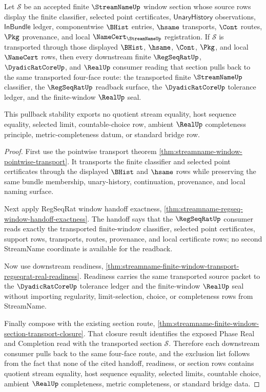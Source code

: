 \begin{theorem}
\label{thm:streamname-finite-window-section-pullback-stability}
Let $\mathcal{S}$ be an accepted finite $\StreamNameUp$ window section whose
source rows display the finite classifier, selected point certificates,
$\mathsf{UnaryHistory}$ observations, $\mathsf{InBundle}$ ledger,
componentwise $\BHist$ entries, $\hsame$ transports, $\Cont$ routes, $\Pkg$
provenance, and local $\NameCert_{\StreamNameUp}$ registration. If
$\mathcal{S}$ is transported through those displayed $\BHist$, $\hsame$,
$\Cont$, $\Pkg$, and local $\NameCert$ rows, then every downstream finite
$\RegSeqRatUp$, $\DyadicRatCoreUp$, and $\RealUp$ consumer reading that
section pulls back to the same transported four-face route: the transported
finite $\StreamNameUp$ classifier, the $\RegSeqRatUp$ readback surface, the
$\DyadicRatCoreUp$ tolerance ledger, and the finite-window $\RealUp$ seal.

This pullback stability exports no quotient stream equality, host sequence
equality, selected limit, countable-choice row, ambient $\RealUp$
completeness principle, metric-completeness datum, or standard bridge row.
\end{theorem}
\begin{proof}
First use the pointwise transport theorem
\autoref{thm:streamname-window-pointwise-transport}. It transports the finite
classifier and selected point certificates through the displayed $\BHist$ and
$\hsame$ rows while preserving the same bundle membership, unary-history,
continuation, provenance, and local naming surface.

Next apply RegSeqRat window handoff exactness,
\autoref{thm:streamname-regseq-window-handoff-exactness}. The handoff says
that the $\RegSeqRatUp$ consumer reads exactly the transported finite-window
classifier, selected point certificates, support rows, transports, routes,
provenance, and local certificate rows; no second StreamName coordinate is
available for the readback.

Now use downstream readiness,
\autoref{thm:streamname-finite-window-transport-regseqrat-real-readiness}.
Readiness carries the same transported source packet to the
$\DyadicRatCoreUp$ tolerance ledger and the finite-window $\RealUp$ seal
without importing regularity, limit-selection, choice, or completeness rows
from StreamName.

Finally compose with the existing section route,
\autoref{thm:streamname-finite-window-section-transport-closure}. That
closure result identifies the exposed Phase Real and Completion read with the
transported section $\mathcal{S}$. Therefore each downstream consumer pulls
back to the same four-face route, and the exclusion list follows from the
fact that none of the cited handoff, readiness, or section rows contains
quotient stream equality, host sequence equality, selected limits,
countable choice, ambient $\RealUp$ completeness, metric completeness, or
standard bridge data.
\end{proof}


